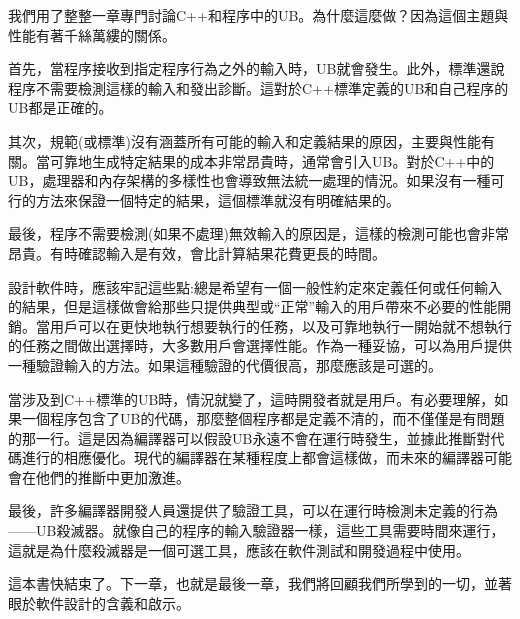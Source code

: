 我們用了整整一章專門討論C++和程序中的UB。為什麼這麼做？因為這個主題與性能有著千絲萬縷的關係。

首先，當程序接收到指定程序行為之外的輸入時，UB就會發生。此外，標準還說程序不需要檢測這樣的輸入和發出診斷。這對於C++標準定義的UB和自己程序的UB都是正確的。

其次，規範(或標準)沒有涵蓋所有可能的輸入和定義結果的原因，主要與性能有關。當可靠地生成特定結果的成本非常昂貴時，通常會引入UB。對於C++中的UB，處理器和內存架構的多樣性也會導致無法統一處理的情況。如果沒有一種可行的方法來保證一個特定的結果，這個標準就沒有明確結果的。

最後，程序不需要檢測(如果不處理)無效輸入的原因是，這樣的檢測可能也會非常昂貴。有時確認輸入是有效，會比計算結果花費更長的時間。

設計軟件時，應該牢記這些點:總是希望有一個一般性約定來定義任何或任何輸入的結果，但是這樣做會給那些只提供典型或“正常”輸入的用戶帶來不必要的性能開銷。當用戶可以在更快地執行想要執行的任務，以及可靠地執行一開始就不想執行的任務之間做出選擇時，大多數用戶會選擇性能。作為一種妥協，可以為用戶提供一種驗證輸入的方法。如果這種驗證的代價很高，那麼應該是可選的。

當涉及到C++標準的UB時，情況就變了，這時開發者就是用戶。有必要理解，如果一個程序包含了UB的代碼，那麼整個程序都是定義不清的，而不僅僅是有問題的那一行。這是因為編譯器可以假設UB永遠不會在運行時發生，並據此推斷對代碼進行的相應優化。現代的編譯器在某種程度上都會這樣做，而未來的編譯器可能會在他們的推斷中更加激進。 

最後，許多編譯器開發人員還提供了驗證工具，可以在運行時檢測未定義的行為——UB殺滅器。就像自己的程序的輸入驗證器一樣，這些工具需要時間來運行，這就是為什麼殺滅器是一個可選工具，應該在軟件測試和開發過程中使用。

這本書快結束了。下一章，也就是最後一章，我們將回顧我們所學到的一切，並著眼於軟件設計的含義和啟示。
